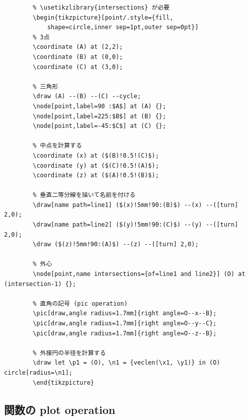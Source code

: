 \documentclass[lualatex]{jlreq}
\begin{document}
\begin{lstlisting}[language={[LaTeX] TeX},numbers=none,breaklines=false,gobble=8]
        % この例では \usetikzlibrary{angles} と
        % \usetikzlibrary{intersections} が必要
        \begin{tikzpicture}[point/.style={fill,
            shape=circle,inner sep=1pt,outer sep=0pt}]
        % 3点
        \coordinate (A) at (2,2);
        \coordinate (B) at (0,0);
        \coordinate (C) at (3,0);

        % 三角形
        \draw (A) --(B) --(C) --cycle;
        \node[point,label=90 :$A$] at (A) {};
        \node[point,label=225:$B$] at (B) {};
        \node[point,label=-45:$C$] at (C) {};

        % 中点を計算する
        \coordinate (x) at ($(B)!0.5!(C)$);
        \coordinate (y) at ($(C)!0.5!(A)$);
        \coordinate (z) at ($(A)!0.5!(B)$);

        % 垂直二等分線を描いて名前を付ける
        \draw[name path=line1] ($(x)!5mm!90:(B)$) --(x) --([turn] 2,0);
        \draw[name path=line2] ($(y)!5mm!90:(C)$) --(y) --([turn] 2,0);
        \draw ($(z)!5mm!90:(A)$) --(z) --([turn] 2,0);

        % 外心
        \node[point,name intersections={of=line1 and line2}] (O) at (intersection-1) {};

        % 直角の記号 (pic operation)
        \pic[draw,angle radius=1.7mm]{right angle=O--x--B};
        \pic[draw,angle radius=1.7mm]{right angle=O--y--C};
        \pic[draw,angle radius=1.7mm]{right angle=O--z--B};

        % 外接円の半径を計算する
        \draw let \p1 = (O), \n1 = {veclen(\x1, \y1)} in (O) circle[radius=\n1];
        \end{tikzpicture}
\end{lstlisting}

\subsection{関数の plot operation}
\end{document}
